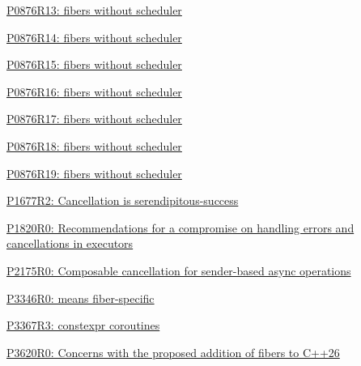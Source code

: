 \begin{thebibliography}{99}
        \href{https://www.open-std.org/jtc1/sc22/wg21/docs/papers/2023/p0876r13.pdf}
        {P0876R13: fibers without scheduler}

        \href{https://www.open-std.org/jtc1/sc22/wg21/docs/papers/2023/p0876r14.pdf}
        {P0876R14: fibers without scheduler}

        \href{https://www.open-std.org/jtc1/sc22/wg21/docs/papers/2024/p0876r15.pdf}
        {P0876R15: fibers without scheduler}

        \href{https://www.open-std.org/jtc1/sc22/wg21/docs/papers/2024/p0876r16.pdf}
        {P0876R16: fibers without scheduler}

        \href{https://www.open-std.org/jtc1/sc22/wg21/docs/papers/2024/p0876r17.pdf}
        {P0876R17: fibers without scheduler}

        \href{https://www.open-std.org/jtc1/sc22/wg21/docs/papers/2024/p0876r18.pdf}
        {P0876R18: fibers without scheduler}

        \href{https://www.open-std.org/jtc1/sc22/wg21/docs/papers/2025/p0876r19.pdf}
        {P0876R19: fibers without scheduler}

        \href{https://www.open-std.org/jtc1/sc22/wg21/docs/papers/2019/p1677r2.pdf}
        {P1677R2: Cancellation is serendipitous-success}

        \href{https://www.open-std.org/jtc1/sc22/wg21/docs/papers/2019/p1820r0.html}
        {P1820R0: Recommendations for a compromise on handling errors and cancellations in executors}

        \href{https://www.open-std.org/jtc1/sc22/wg21/docs/papers/2020/p2175r0.html}
        {P2175R0: Composable cancellation for sender-based async operations}

        \href{https://www.open-std.org/jtc1/sc22/wg21/docs/papers/2024/p3346r0.pdf}
        {P3346R0: \tlocal means fiber-specific}

        \href{https://www.open-std.org/jtc1/sc22/wg21/docs/papers/2025/p3367r3.html}
        {P3367R3: constexpr coroutines}

        \href{https://isocpp.org/files/papers/P3620R0.pdf}
        {P3620R0: Concerns with the proposed addition of fibers to C++26}


\end{thebibliography}
